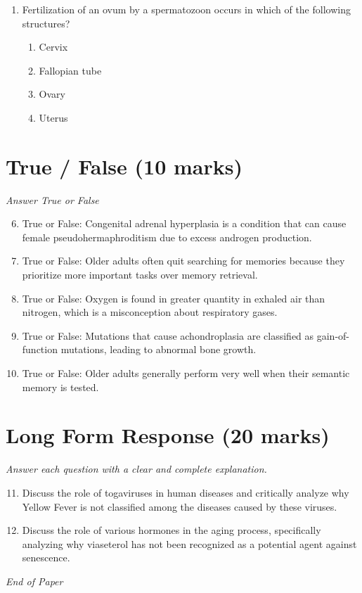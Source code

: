 \documentclass[12pt]{article}
\begin{document}
\begin{enumerate}[label=\arabic*.]
\begin{enumerate}[label=(\alph*)]
    \item is a measure of the level of heterozygotes in a population
    \item is a measure of the proportion of variation that is due to genetic causes
    \item is a measure of proportion of repeated DNA in an organism
    \item is a measure of level of gene linkage
\end{enumerate}
\item Fertilization of an ovum by a spermatozoon occurs in which of the following structures?
\begin{enumerate}[label=(\alph*)]
    \item Cervix
    \item Fallopian tube
    \item Ovary
    \item Uterus
\end{enumerate}
\end{enumerate}

\section*{True / False (10 marks)}
\textit{Answer True or False}
\begin{enumerate}[label=\arabic*.]
\setcounter{enumi}{5}
\item True or False: Congenital adrenal hyperplasia is a condition that can cause female pseudohermaphroditism due to excess androgen production.
\item True or False: Older adults often quit searching for memories because they prioritize more important tasks over memory retrieval.
\item True or False: Oxygen is found in greater quantity in exhaled air than nitrogen, which is a misconception about respiratory gases.
\item True or False: Mutations that cause achondroplasia are classified as gain-of-function mutations, leading to abnormal bone growth.
\item True or False: Older adults generally perform very well when their semantic memory is tested.
\end{enumerate}

\section*{Long Form Response (20 marks)}
\textit{Answer each question with a clear and complete explanation.}
\begin{enumerate}[label=\arabic*.]
\setcounter{enumi}{10}
\item Discuss the role of togaviruses in human diseases and critically analyze why Yellow Fever is not classified among the diseases caused by these viruses.
\item Discuss the role of various hormones in the aging process, specifically analyzing why viaseterol has not been recognized as a potential agent against senescence.
\end{enumerate}

\vfill
\noindent\textit{End of Paper}
\end{document}
